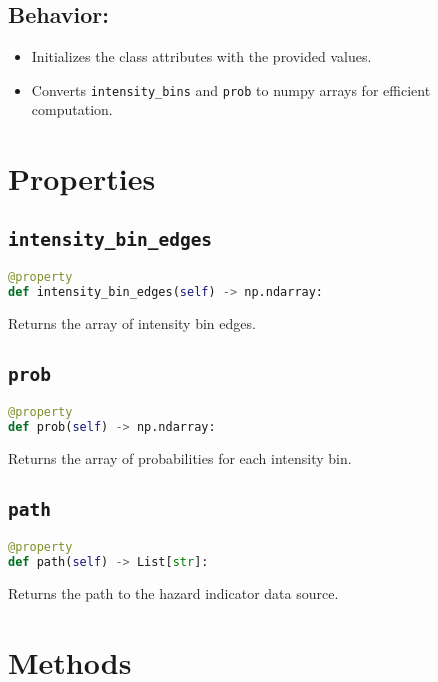 \documentclass{article}
\begin{document}
\subsection{Behavior:}

\begin{itemize}
    \item Initializes the class attributes with the provided values.
    \item Converts \texttt{intensity\_bins} and \texttt{prob} to numpy arrays for efficient computation.
\end{itemize}

\section{Properties}

\subsection{\texttt{intensity\_bin\_edges}}

\begin{lstlisting}[language=Python]
@property
def intensity_bin_edges(self) -> np.ndarray:
\end{lstlisting}

Returns the array of intensity bin edges.

\subsection{\texttt{prob}}

\begin{lstlisting}[language=Python]
@property
def prob(self) -> np.ndarray:
\end{lstlisting}

Returns the array of probabilities for each intensity bin.

\subsection{\texttt{path}}

\begin{lstlisting}[language=Python]
@property
def path(self) -> List[str]:
\end{lstlisting}

Returns the path to the hazard indicator data source.

\section{Methods}
\end{document}
